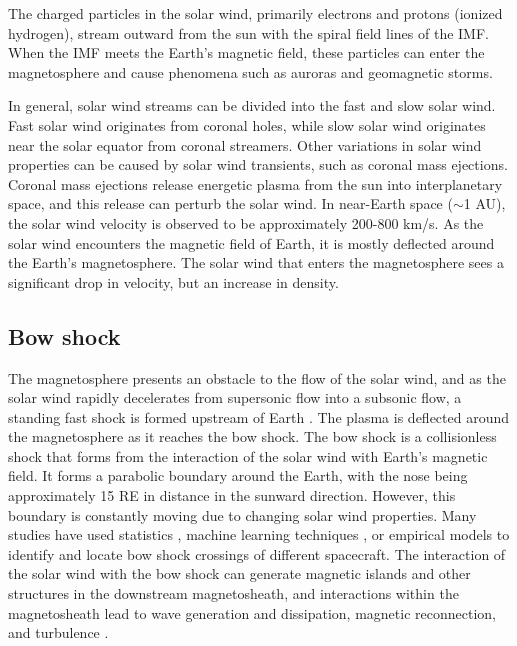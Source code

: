\noindent The charged particles in the solar wind, primarily electrons and protons (ionized hydrogen), stream outward from the sun with the spiral field lines of the IMF. When the IMF meets the Earth's magnetic field, these particles can enter the magnetosphere and cause phenomena such as auroras and geomagnetic storms. 

In general, solar wind streams can be divided into the fast and slow solar wind. Fast solar wind originates from coronal holes, while slow solar wind originates near the solar equator from coronal streamers. Other variations in solar wind properties can be caused by solar wind transients, such as coronal mass ejections. Coronal mass ejections release energetic plasma from the sun into interplanetary space, and this release can perturb the solar wind. In near-Earth space ($\sim$1 \gls{AU}), the solar wind velocity is observed to be approximately 200-800 km/s. As the solar wind encounters the magnetic field of Earth, it is mostly deflected around the Earth's magnetosphere. The solar wind that enters the magnetosphere sees a significant drop in velocity, but an increase in density.

\subsection{Bow shock}
The magnetosphere presents an obstacle to the flow of the solar wind, and as the solar wind rapidly decelerates from supersonic flow into a subsonic flow, a standing fast shock is formed upstream of Earth \citep{Dimmock:2013}. The plasma is deflected around the magnetosphere as it reaches the bow shock. The bow shock is a collisionless shock that forms from the interaction of the solar wind with Earth's magnetic field. It forms a parabolic boundary around the Earth, with the nose being approximately 15 \gls{RE} in distance in the sunward direction. However, this boundary is constantly moving due to changing solar wind properties. Many studies have used statistics \citep{Kruparova:2019}, machine learning techniques \citep{Lalti:2022}, or empirical models \citep{chapman_three-dimensional_2003} to identify and locate bow shock crossings of different spacecraft. The interaction of the solar wind with the bow shock can generate magnetic islands and other structures \citep{Karimabadi:2014} in the downstream magnetosheath, and interactions within the magnetosheath lead to wave generation and dissipation, magnetic reconnection, and turbulence \citep{Shaikh:2022}. %

